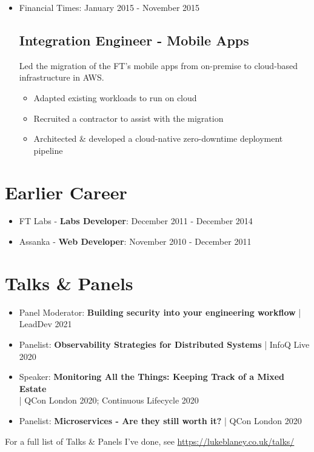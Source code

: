 \documentclass[a4paper]{article}
\newenvironment{detail}{\begin{adjustwidth}{10pt}{}}{\end{adjustwidth}}
\begin{document}
\begin{itemize}
\item Financial Times: January 2015 - November 2015
\subsection*{Integration Engineer - Mobile Apps}
\begin{detail}
Led the migration of the FT's mobile apps from on-premise to cloud-based infrastructure in AWS.
\begin{itemize}
	\item Adapted existing workloads to run on cloud
	\item Recruited a contractor to assist with the migration
	\item Architected \& developed a cloud-native zero-downtime deployment pipeline
\end{itemize}
\end{detail}

\end{itemize}

\section*{Earlier Career}
\begin{itemize}

\item FT Labs - {\bf Labs Developer}: December 2011 - December 2014
\item Assanka - {\bf Web Developer}: November 2010 - December 2011

\end{itemize}

\pagebreak

\section*{Talks \& Panels}
\begin{itemize}

\item Panel Moderator: {\bf Building security into your engineering workflow} | LeadDev 2021
\item Panelist: {\bf Observability Strategies for Distributed Systems} | InfoQ Live 2020
\item Speaker: {\bf Monitoring All the Things: Keeping Track of a Mixed Estate}\\ | QCon London 2020; Continuous Lifecycle 2020
\item Panelist: {\bf Microservices - Are they still worth it?} | QCon London 2020
\end{itemize}
For a full list of Talks \& Panels I've done, see \url{https://lukeblaney.co.uk/talks/}
\end{document}
